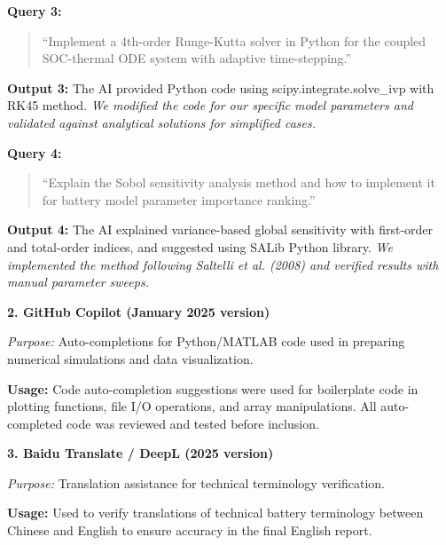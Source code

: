 \vspace{0.5em}

\noindent\textbf{Query 3:}
\begin{quote}
``Implement a 4th-order Runge-Kutta solver in Python for the coupled SOC-thermal ODE system with adaptive time-stepping.''
\end{quote}

\noindent\textbf{Output 3:} The AI provided Python code using scipy.integrate.solve\_ivp with RK45 method. \textit{We modified the code for our specific model parameters and validated against analytical solutions for simplified cases.}

\vspace{0.5em}

\noindent\textbf{Query 4:}
\begin{quote}
``Explain the Sobol sensitivity analysis method and how to implement it for battery model parameter importance ranking.''
\end{quote}

\noindent\textbf{Output 4:} The AI explained variance-based global sensitivity with first-order and total-order indices, and suggested using SALib Python library. \textit{We implemented the method following Saltelli et al. (2008) and verified results with manual parameter sweeps.}

\vspace{1em}

\noindent\textbf{2. GitHub Copilot (January 2025 version)}

\noindent\textit{Purpose:} Auto-completions for Python/MATLAB code used in preparing numerical simulations and data visualization.

\noindent\textbf{Usage:} Code auto-completion suggestions were used for boilerplate code in plotting functions, file I/O operations, and array manipulations. All auto-completed code was reviewed and tested before inclusion.

\vspace{1em}

\noindent\textbf{3. Baidu Translate / DeepL (2025 version)}

\noindent\textit{Purpose:} Translation assistance for technical terminology verification.

\noindent\textbf{Usage:} Used to verify translations of technical battery terminology between Chinese and English to ensure accuracy in the final English report.

\vspace{1em}

